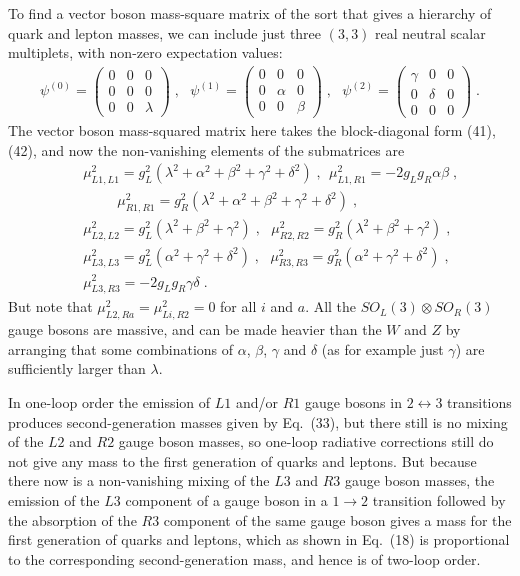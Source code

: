 \documentclass[12pt]{article}
\begin{document}
To find a vector boson mass-square matrix of the sort that gives a hierarchy of quark and lepton masses, we can include  just three $(3,3)$ real neutral scalar multiplets, with non-zero expectation values:
\begin{eqnarray}
\psi^{(0)}=\left(\begin{array}{ccc}0 & 0 & 0 \\ 0 & 0 & 0 \\ 0 & 0 & \lambda\end{array}\right)\;,~~~
\psi^{(1)}=\left(\begin{array}{ccc}0 & 0 & 0 \\ 0 & \alpha & 0 \\ 0 & 0 & \beta\end{array}\right)\;,~~~
\psi^{(2)}=\left(\begin{array}{ccc}\gamma & 0 & 0 \\ 0 & \delta & 0 \\ 0 & 0 & 0\end{array}\right)\;.
\end{eqnarray}
  The vector boson mass-squared matrix here takes the block-diagonal form (41), (42), and now the non-vanishing elements of the submatrices are
\begin{eqnarray}
&&\mu_{L1,L1}^2=g_L^2(\lambda^2+\alpha^2+\beta^2+\gamma^2+\delta^2)\;,~~\mu_{L1,R1}^2=-2g_Lg_R\alpha\beta\;,\nonumber\\&&~~~~~~~~~~~\mu_{R1,R1}^2=g_R^2(\lambda^2+\alpha^2+\beta^2+\gamma^2+\delta^2)\;,\nonumber\\&&
\mu^2_{L2,L2}=g_L^2(\lambda^2+\beta^2+\gamma^2)\;,~~~\mu^2_{R2,R2}=g_R^2(\lambda^2+\beta^2+\gamma^2)\;,	\nonumber\\&&
\mu^2_{L3,L3}=g_L^2(\alpha^2+\gamma^2+\delta^2)\;,~~~\mu^2_{R3,R3}=g_R^2(\alpha^2+\gamma^2+\delta^2)\;,\nonumber\\&&
\mu^2_{L3,R3}=-2g_Lg_R\gamma\delta\;.
\end{eqnarray}
But note that $\mu^2_{L2,Ra}=\mu^2_{Li,R2}=0$ for all $i$  and $a$.
All the $SO_L(3)\otimes  SO_R(3)$ gauge bosons are massive, and can be made heavier than the $W$ and $Z$ by arranging that some combinations of $\alpha$, $\beta$, $\gamma$ and
$\delta$ (as for example just $\gamma$) are sufficiently larger than $\lambda$.  

 In one-loop order the emission of $L1$ and/or $R1$ gauge bosons in $2\leftrightarrow 3$ transitions produces second-generation masses given by Eq.~(33), but there still is no  mixing of the $L2$ and $R2$ gauge boson masses, so  one-loop radiative corrections  still do not give any  mass to the first  generation of quarks and leptons.  But because there now is a non-vanishing mixing of the $L3$ and $R3$ gauge boson masses, the emission of the  $L3$ component of a gauge boson in a $1\rightarrow 2$ transition followed by the absorption of the $R3$ component of the same gauge boson gives a mass for the first generation of quarks and leptons, which as shown in Eq.~(18) is proportional to the corresponding second-generation mass, and hence is of two-loop order.  
\end{document}
